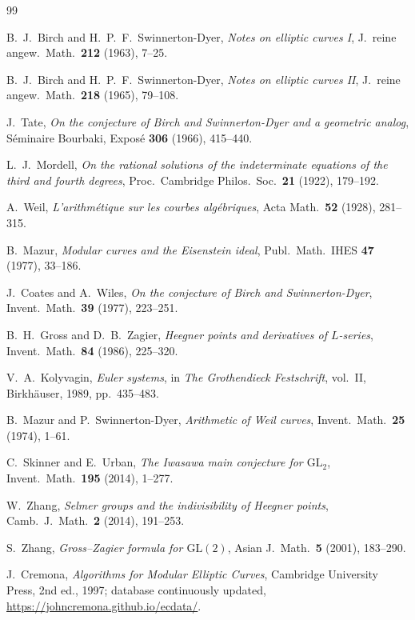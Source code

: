 \documentclass[12pt,a4paper]{article}
\theoremstyle{remark}
\begin{document}
\begin{thebibliography}{99}

B.~J.~Birch and H.~P.~F.~Swinnerton-Dyer,
\textit{Notes on elliptic curves I},
J.\ reine angew.\ Math.\ \textbf{212} (1963), 7--25.

B.~J.~Birch and H.~P.~F.~Swinnerton-Dyer,
\textit{Notes on elliptic curves II},
J.\ reine angew.\ Math.\ \textbf{218} (1965), 79--108.

J.~Tate,
\textit{On the conjecture of Birch and Swinnerton-Dyer and a geometric analog},
Séminaire Bourbaki, Exposé \textbf{306} (1966), 415--440.

L.~J.~Mordell,
\textit{On the rational solutions of the indeterminate equations of the third and fourth degrees},
Proc.\ Cambridge Philos.\ Soc.\ \textbf{21} (1922), 179--192.

A.~Weil,
\textit{L'arithmétique sur les courbes algébriques},
Acta Math.\ \textbf{52} (1928), 281--315.

B.~Mazur,
\textit{Modular curves and the Eisenstein ideal},
Publ.\ Math.\ IHES \textbf{47} (1977), 33--186.

J.~Coates and A.~Wiles,
\textit{On the conjecture of Birch and Swinnerton-Dyer},
Invent.\ Math.\ \textbf{39} (1977), 223--251.

B.~H.~Gross and D.~B.~Zagier,
\textit{Heegner points and derivatives of $L$-series},
Invent.\ Math.\ \textbf{84} (1986), 225--320.

V.~A.~Kolyvagin,
\textit{Euler systems},
in \textit{The Grothendieck Festschrift}, vol.~II, Birkhäuser, 1989, pp.~435--483.

B.~Mazur and P.~Swinnerton-Dyer,
\textit{Arithmetic of Weil curves},
Invent.\ Math.\ \textbf{25} (1974), 1--61.

C.~Skinner and E.~Urban,
\textit{The Iwasawa main conjecture for $\mathrm{GL}_2$},
Invent.\ Math.\ \textbf{195} (2014), 1--277.

W.~Zhang,
\textit{Selmer groups and the indivisibility of Heegner points},
Camb.\ J.\ Math.\ \textbf{2} (2014), 191--253.

S.~Zhang,
\textit{Gross--Zagier formula for $\mathrm{GL}(2)$},
Asian J.\ Math.\ \textbf{5} (2001), 183--290.

J.~Cremona,
\textit{Algorithms for Modular Elliptic Curves},
Cambridge University Press, 2nd ed., 1997; database continuously updated,
\url{https://johncremona.github.io/ecdata/}.


\end{thebibliography}
\end{document}
